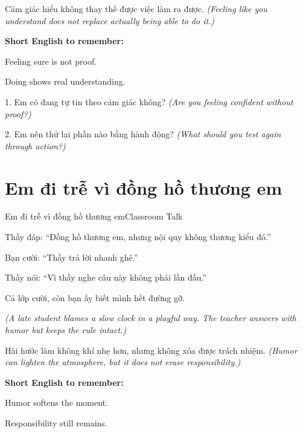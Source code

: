 \begin{baihoc}
Cảm giác hiểu không thay thế được việc làm ra được.
\textit{(Feeling like you understand does not replace actually being able to do it.)}
\end{baihoc}

\begin{ghinhoanh}
\textbf{Short English to remember:}

Feeling sure is not proof.

Doing shows real understanding.
\end{ghinhoanh}

\begin{tuhocnhanh}
1. Em có đang tự tin theo cảm giác không? \textit{(Are you feeling confident without proof?)}

2. Em nên thử lại phần nào bằng hành động? \textit{(What should you test again through action?)}
\end{tuhocnhanh}
\ngancach

\section{Em đi trễ vì đồng hồ thương em}
\begin{truyen}{Em đi trễ vì đồng hồ thương em}{Classroom Talk}

Thầy đáp: ``Đồng hồ thương em, nhưng nội quy không thương kiểu đó.''

Bạn cười: ``Thầy trả lời nhanh ghê.''

Thầy nói: ``Vì thầy nghe câu này không phải lần đầu.''

Cả lớp cười, còn bạn ấy biết mình hết đường gỡ.

\textit{(A late student blames a slow clock in a playful way. The teacher answers with humor but keeps the rule intact.)}
\end{truyen}

\begin{baihoc}
Hài hước làm không khí nhẹ hơn, nhưng không xóa được trách nhiệm.
\textit{(Humor can lighten the atmosphere, but it does not erase responsibility.)}
\end{baihoc}

\begin{ghinhoanh}
\textbf{Short English to remember:}

Humor softens the moment.

Responsibility still remains.
\end{ghinhoanh}

